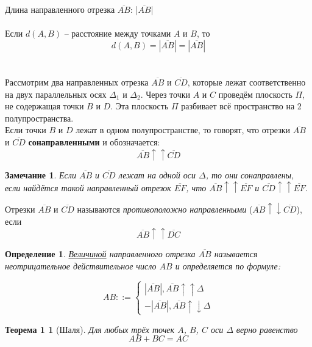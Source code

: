 \documentclass[a4paper, 12pt]{report}
\begin{document}
	Длина направленного отрезка $\overline{AB}$: |$\overline{AB}$|\\\\
	Если $d(A, B)$ -- расстояние между точками $A$ и $B$, то \[d(A, B) = |\overline{AB}| = |\overline{AB}|\]\\\\
	
	\quad{} Рассмотрим два направленных отрезка $\overline{AB}$ и $\overline{CD}$, которые лежат соответственно на двух параллельных осях $\Delta_1$ и $\Delta_2$. Через точки $A$ и $C$ проведём плоскость $\Pi$, не содержащая точки $B$ и $D$. Эта плоскость $\Pi$ разбивает всё пространство на 2 полупространства.\\
	\quad{} Если точки $B$ и $D$ лежат в одном полупространстве, то говорят, что отрезки $\overline{AB}$ и $\overline{CD}$ \textbf{сонаправленными} и обозначается: $$\overline{AB} \uparrow\uparrow \overline{CD}$$
	\newtheorem*{Note}{Замечание}
	\begin{Note}
	Если $\overline{AB}$ и $\overline{CD}$ лежат на одной оси $\Delta$, то они сонаправлены, если найдётся такой направленный отрезок $\overline{EF}$, что $\overline{AB} \uparrow\uparrow \overline{EF}$ и $\overline{CD} \uparrow\uparrow \overline{EF}$.
	\end{Note}
	Отрезки $\overline{AB}$ и $\overline{CD}$ называются \textit{противоположно направленными} ($\overline{AB} \uparrow\downarrow \overline{CD}$), если $$\overline{AB} \uparrow\uparrow \overline{DC}$$
	\newtheorem*{Def1}{Определение}
	\begin{Def1}
		\underline{Величиной} направленного отрезка $\overline{AB}$ называется неотрицательное действительное число $AB$ и определяется по формуле:
	\end{Def1}
	\begin{equation}\label{1.1}
		AB ::= \left\{
		\begin{split}
			|\overline{AB}|, \overline{AB} \uparrow\uparrow \Delta \\
			-|\overline{AB}|, \overline{AB} \uparrow\downarrow \Delta
		\end{split}\right. \tag{1}
	\end{equation}
	\newtheorem*{Th1}{Теорема 1}
	\begin{Th1}[Шаля]\label{thShal}
		Для любых трёх точек $A$, $B$, $C$ оси $\Delta$ верно равенство
		\begin{equation}\label{1.2}
			AB + BC = AC \tag{2}
		\end{equation}
	\end{Th1}
\end{document}
